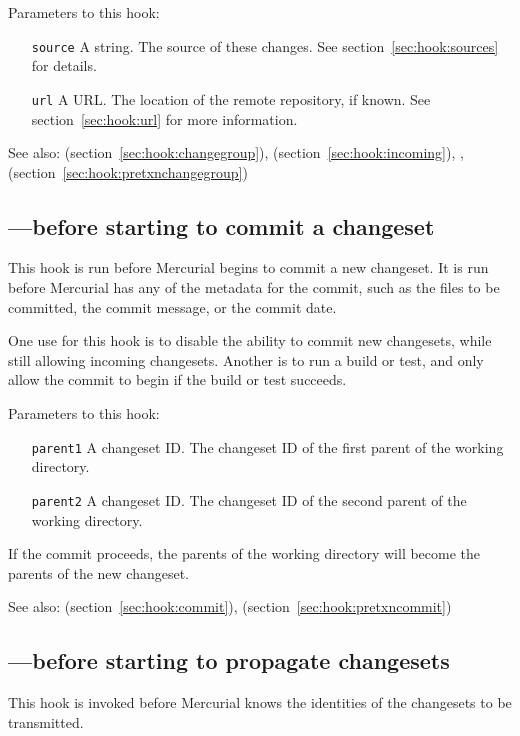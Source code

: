 Parameters to this hook:
\begin{itemize}
\item[\texttt{source}] A string.  The source of these changes.  See
  section~\ref{sec:hook:sources} for details.
\item[\texttt{url}] A URL.  The location of the remote repository, if
  known.  See section~\ref{sec:hook:url} for more information.
\end{itemize}

See also:  (section~\ref{sec:hook:changegroup}),
 (section~\ref{sec:hook:incoming}), ,
 (section~\ref{sec:hook:pretxnchangegroup})

\subsection{---before starting to commit a changeset}
\label{sec:hook:precommit}

This hook is run before Mercurial begins to commit a new changeset.
It is run before Mercurial has any of the metadata for the commit,
such as the files to be committed, the commit message, or the commit
date.

One use for this hook is to disable the ability to commit new
changesets, while still allowing incoming changesets.  Another is to
run a build or test, and only allow the commit to begin if the build
or test succeeds.

Parameters to this hook:
\begin{itemize}
\item[\texttt{parent1}] A changeset ID.  The changeset ID of the first
  parent of the working directory.
\item[\texttt{parent2}] A changeset ID.  The changeset ID of the second
  parent of the working directory.
\end{itemize}
If the commit proceeds, the parents of the working directory will
become the parents of the new changeset.

See also:  (section~\ref{sec:hook:commit}),
 (section~\ref{sec:hook:pretxncommit})

\subsection{---before starting to propagate changesets}
\label{sec:hook:preoutgoing}

This hook is invoked before Mercurial knows the identities of the
changesets to be transmitted.

